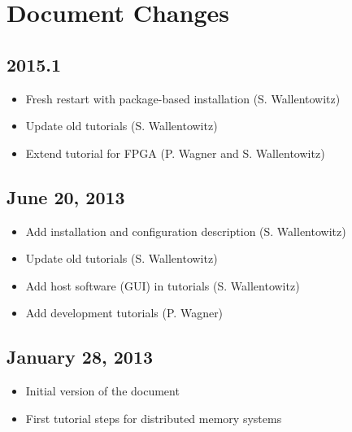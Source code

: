 \section*{Document Changes}


\subsection*{2015.1}
\begin{itemize}
\item Fresh restart with package-based installation (S. Wallentowitz)
\item Update old tutorials (S. Wallentowitz)
\item Extend tutorial for FPGA (P. Wagner and S. Wallentowitz)
\end{itemize}

\subsection*{June 20, 2013}
\begin{itemize}
\item Add installation and configuration description (S. Wallentowitz)
\item Update old tutorials (S. Wallentowitz)
\item Add host software (GUI) in tutorials (S. Wallentowitz)
\item Add development tutorials (P. Wagner) 
\end{itemize}

\subsection*{January 28, 2013}
\begin{itemize}
\item Initial version of the document
\item First tutorial steps for distributed memory systems
\end{itemize}
